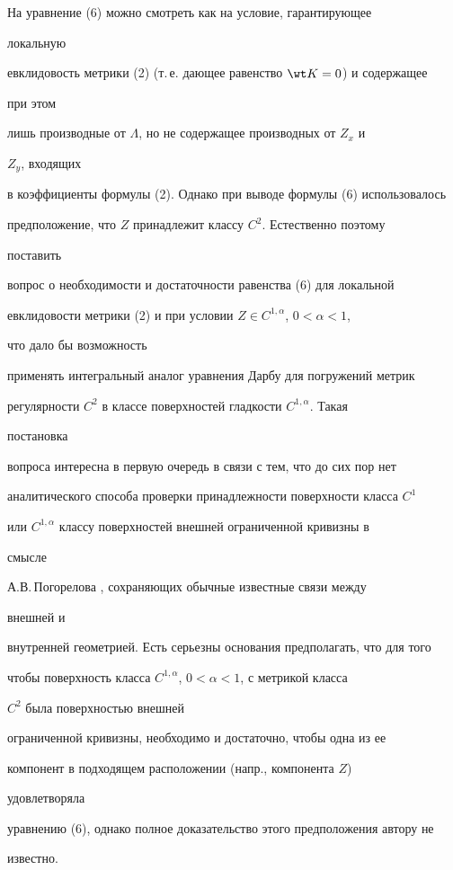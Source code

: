 \begin{note} На уравнение (6) можно смотреть как на условие, гарантирующее 


локальную 


евклидовость метрики (2) (т.\,е. дающее равенство $\wt K=0$) и содержащее 


при этом 


лишь производные от $\Lambda$, но не содержащее производных от $Z_x$ и 


$Z_y$, входящих 


в коэффициенты формулы (2). Однако при выводе формулы (6) использовалось 


предположение, что $Z$ принадлежит классу $C^2$. Естественно поэтому 


поставить 


вопрос о необходимости и достаточности равенства (6) для локальной 


евклидовости метрики (2) и при условии $Z\in C^{1,\alpha}$, $0<\alpha<1$, 


что дало бы возможность 


применять интегральный аналог уравнения Дарбу для погружений метрик 


регулярности $C^2$ в классе поверхностей гладкости $C^{1,\alpha}$. Такая 


постановка 


вопроса интересна в первую очередь в связи с тем, что до сих пор нет 


аналитического способа проверки принадлежности поверхности класса $C^1$ 


или $C^{1,\alpha}$ классу поверхностей внешней ограниченной кривизны в 


смысле 


А.В.\,Погорелова \cite{Pog}, сохраняющих обычные известные связи между 


внешней и 


внутренней геометрией. Есть серьезны основания предполагать, что для того 


чтобы поверхность класса $C^{1,\alpha}$, $0<\alpha<1$, с метрикой класса 


$C^2$ была поверхностью внешней 


ограниченной кривизны, необходимо и достаточно, чтобы одна из ее 


компонент в подходящем расположении (напр., компонента $Z$) 


удовлетворяла 


уравнению (6), однако полное доказательство этого предположения автору не 


известно. 


\end{note} 


